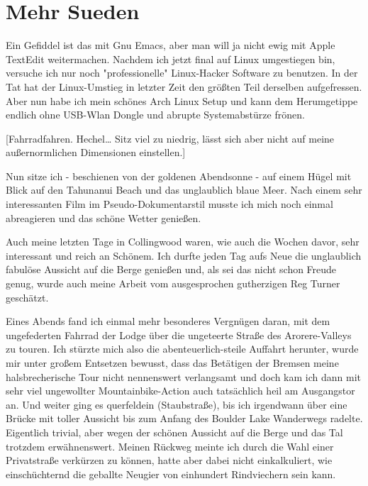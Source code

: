 \chapter{Mehr Sueden}

Ein Gefiddel ist das mit Gnu Emacs, aber man will ja nicht ewig mit
Apple TextEdit weitermachen. Nachdem ich jetzt final auf Linux
umgestiegen bin, versuche ich nur noch "professionelle" Linux-Hacker
Software zu benutzen. In der Tat hat der Linux-Umstieg in letzter Zeit
den größten Teil derselben aufgefressen. Aber nun habe ich mein schönes
Arch Linux Setup und kann dem Herumgetippe endlich ohne USB-Wlan Dongle
und abrupte Systemabstürze frönen.

{[}Fahrradfahren. Hechel\ldots{} Sitz viel zu niedrig, lässt sich aber
nicht auf meine außernormlichen Dimensionen einstellen.{]}

Nun sitze ich - beschienen von der goldenen Abendsonne - auf einem Hügel
mit Blick auf den Tahunanui Beach und das unglaublich blaue Meer. Nach
einem sehr interessanten Film im Pseudo-Dokumentarstil musste ich mich
noch einmal abreagieren und das schöne Wetter genießen.

Auch meine letzten Tage in Collingwood waren, wie auch die Wochen davor,
sehr interessant und reich an Schönem. Ich durfte jeden Tag aufs Neue
die unglaublich fabulöse Aussicht auf die Berge genießen und, als sei
das nicht schon Freude genug, wurde auch meine Arbeit vom ausgesprochen
gutherzigen Reg Turner geschätzt.

Eines Abends fand ich einmal mehr besonderes Vergnügen daran, mit dem
ungefederten Fahrrad der Lodge über die ungeteerte Straße des
Arorere-Valleys zu touren. Ich stürzte mich also die
abenteuerlich-steile Auffahrt herunter, wurde mir unter großem Entsetzen
bewusst, dass das Betätigen der Bremsen meine halsbrecherische Tour
nicht nennenswert verlangsamt und doch kam ich dann mit sehr viel
ungewollter Mountainbike-Action auch tatsächlich heil am Ausgangstor an.
Und weiter ging es querfeldein (Staubstraße), bis ich irgendwann über
eine Brücke mit toller Aussicht bis zum Anfang des Boulder Lake
Wanderwegs radelte. Eigentlich trivial, aber wegen der schönen Aussicht
auf die Berge und das Tal trotzdem erwähnenswert. Meinen Rückweg meinte
ich durch die Wahl einer Privatstraße verkürzen zu können, hatte aber
dabei nicht einkalkuliert, wie einschüchternd die geballte Neugier von
einhundert Rindviechern sein kann.

